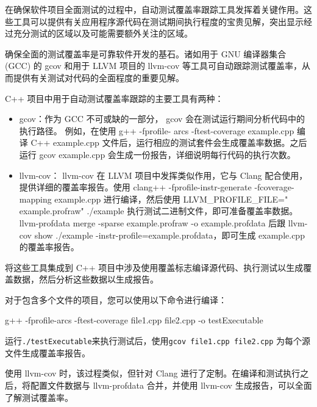 
在确保软件项目全面测试的过程中，自动测试覆盖率跟踪工具发挥着关键作用。这些工具可以提供有关应用程序源代码在测试期间执行程度的宝贵见解，突出显示经过充分测试的区域以及可能需要额外关注的区域。


确保全面的测试覆盖率是可靠软件开发的基石。诸如用于 GNU 编译器集合 (GCC) 的 gcov 和用于 LLVM 项目的 llvm-cov 等工具可自动跟踪测试覆盖率，从而提供有关测试对代码的全面程度的重要见解。


C++ 项目中用于自动测试覆盖率跟踪的主要工具有两种：

\begin{itemize}
\item
gcov：作为 GCC 不可或缺的一部分， gcov 会在测试运行期间分析代码中的执行路径。
例如，在使用 g++ -fprofile- arcs -ftest-coverage example.cpp 编译 C++ example.cpp 文件后，运行相应的测试套件会生成覆盖率数据。之后运行 gcov example.cpp 会生成一份报告，详细说明每行代码的执行次数。

\item
llvm-cov： llvm-cov 在 LLVM 项目中发挥类似作用，它与 Clang 配合使用，提供详细的覆盖率报告。使用 clang++ -fprofile-instr-generate -fcoverage-mapping example.cpp 进行编译，然后使用 LLVM\_PROFILE\_FILE=" example.profraw" ./example 执行测试二进制文件，即可准备覆盖率数据。 llvm-profdata merge -sparse example.profraw -o example.profdata 后跟 llvm-cov show ./example -instr-profile=example.profdata，即可生成 example.cpp 的覆盖率报告。
\end{itemize}


将这些工具集成到 C++ 项目中涉及使用覆盖标志编译源代码、执行测试以生成覆盖数据，然后分析这些数据以生成报告。

对于包含多个文件的项目，您可以使用以下命令进行编译：

\begin{shell}
g++ -fprofile-arcs -ftest-coverage file1.cpp file2.cpp -o testExecutable
\end{shell}

运行\verb|./testExecutable|来执行测试后，使用\verb|gcov file1.cpp file2.cpp| 为每个源文件生成覆盖率报告。

使用 llvm-cov 时，该过程类似，但针对 Clang 进行了定制。在编译和测试执行之后，将配置文件数据与 llvm-profdata 合并，并使用 llvm-cov 生成报告，可以全面了解测试覆盖率。

